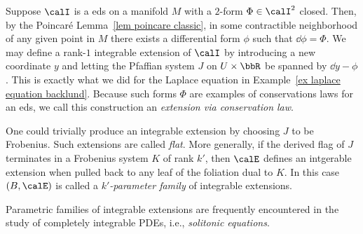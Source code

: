 \begin{rem}\label{rem 7.5.4 Ivey}
    Suppose $\calI$ is a \gls{eds} on a manifold $M$ with a $2$-form $\Phi\in\calI^2$ closed. Then, by the Poincar\'e Lemma~\ref{lem poincare classic}, in some contractible neighborhood of any given point in $M$ there exists a differential form $\phi$ such that $\dd\phi=\Phi$. We may define a rank-$1$ integrable extension of $\calI$ by introducing a new coordinate $y$ and letting the Pfaffian system $J$ on $U\times\bbR$ be spanned by $\dd y-\phi$. This is exactly what we did for the Laplace equation in Example~\ref{ex laplace equation backlund}. Because such forms $\Phi$ are examples of conservations laws for an \gls{eds}, we call this construction an \emph{extension via conservation law}.
\end{rem}


\begin{rem}
    One could trivially produce an integrable extension by choosing $J$ to be Frobenius. Such extensions are called \emph{flat}. More generally, if the derived flag of $J$ terminates in a Frobenius system $K$ of rank $k'$, then $\calE$ defines an intgerable extension when pulled back to any leaf of the foliation dual to $K$. In this case $(B,\calE)$ is called a \emph{$k'$-parameter family} of integrable extensions.
\end{rem}

Parametric families of integrable extensions are frequently encountered in the study of completely integrable PDEs, i.e., \emph{solitonic equations}. 

